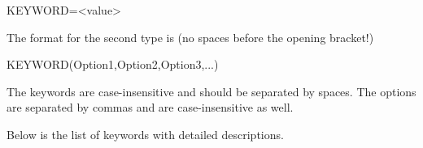\documentclass[oneside,11pt,openany]{book}
\newcommand{\tw}{\ttfamily}
\begin{document}
\begin{description}
\item {\tw KEYWORD=<value>}
\end{description}

\noindent The format for the second type is (no spaces before
the opening bracket!)

\begin{description}
\item {\tw KEYWORD(Option1,Option2,Option3,...)}
\end{description}

\noindent The keywords are case-insensitive and should be separated
by spaces. The options are separated by commas and are case-insensitive
as well.

Below is the list of keywords with detailed descriptions.

%
\end{document}
